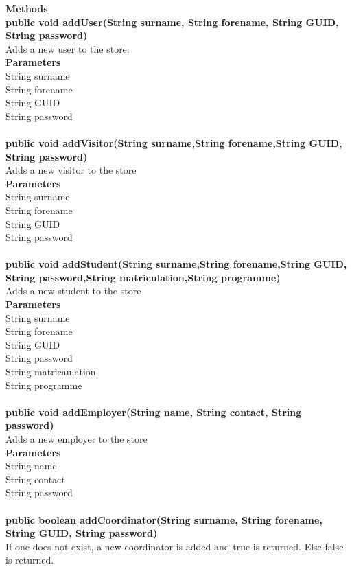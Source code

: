 \documentclass{l3deliverable}
\begin{document}
\textbf{Methods}\\
\textbf{public void addUser(String surname, String forename, String GUID, String password)}\\
Adds a new user to the store.\\
\textbf{Parameters}\\
String surname\\
String forename\\
String GUID\\
String password\\
\\
\textbf{public void addVisitor(String surname,String forename,String GUID, String password)}\\
Adds a new visitor to the store\\
\textbf{Parameters}\\
String surname\\
String forename\\
String GUID\\
String password\\
\\
\textbf{public void addStudent(String surname,String forename,String GUID, String password,String matriculation,String programme)}\\
Adds a new student to the store\\
\textbf{Parameters}\\
String surname\\
String forename\\
String GUID\\
String password\\
String matricaulation\\
String programme\\
\\
\textbf{public void addEmployer(String name, String contact, String password)}\\
Adds a new employer to the store\\
\textbf{Parameters}\\
String name\\
String contact\\
String password\\
\\
\textbf{public boolean addCoordinator(String surname, String forename, String GUID, String password)}\\
If one does not exist, a new coordinator is added and true is returned. Else false is returned.
\end{document}
